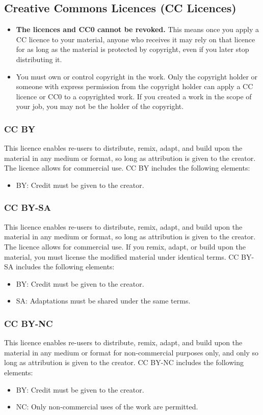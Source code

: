 \documentclass[11pt]{article}
\begin{document}
\subsection{Creative Commons Licences (CC Licences)}
\label{sec:org3ac30b4}
\begin{itemize}
\item \textbf{The licences and CC0 cannot be revoked.} This means once you apply a CC licence to your material, anyone who receives it may rely on that licence for as long as the material is protected by copyright, even if you later stop distributing it.
\item You must own or control copyright in the work. Only the copyright holder or someone with express permission from the copyright holder can apply a CC licence or CC0 to a copyrighted work. If you created a work in the scope of your job, you may not be the holder of the copyright.
\end{itemize}
\subsubsection{CC BY}
\label{sec:org02f7a0f}
This licence enables re-users to distribute, remix, adapt, and build upon the material in any medium or format, so long as attribution is given to the creator. The licence allows for commercial use. CC BY includes the following elements:
\begin{itemize}
\item BY: Credit must be given to the creator.
\end{itemize}
\subsubsection{CC BY-SA}
\label{sec:org89b2cf0}
This licence enables re-users to distribute, remix, adapt, and build upon the material in any medium or format, so long as attribution is given to the creator. The licence allows for commercial use. If you remix, adapt, or build upon the material, you must license the modified material under identical terms. CC BY-SA includes the following elements:
\begin{itemize}
\item BY: Credit must be given to the creator.
\item SA: Adaptations must be shared under the same terms.
\end{itemize}
\subsubsection{CC BY-NC}
\label{sec:org107900e}
This licence enables re-users to distribute, remix, adapt, and build upon the material in any medium or format for non-commercial purposes only, and only so long as attribution is given to the creator. CC BY-NC includes the following elements:
\begin{itemize}
\item BY: Credit must be given to the creator.
\item NC: Only non-commercial uses of the work are permitted.
\end{itemize}
\end{document}
